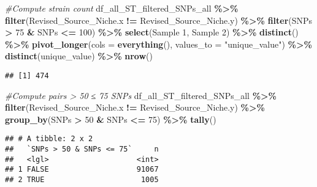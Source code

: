 \documentclass[
]{article}
\newenvironment{Shaded}{\begin{snugshade}}{\end{snugshade}}
\newcommand{\AttributeTok}[1]{\textcolor[rgb]{0.13,0.29,0.53}{#1}}
\newcommand{\CommentTok}[1]{\textcolor[rgb]{0.56,0.35,0.01}{\textit{#1}}}
\newcommand{\DecValTok}[1]{\textcolor[rgb]{0.00,0.00,0.81}{#1}}
\newcommand{\FunctionTok}[1]{\textcolor[rgb]{0.13,0.29,0.53}{\textbf{#1}}}
\newcommand{\NormalTok}[1]{#1}
\newcommand{\SpecialCharTok}[1]{\textcolor[rgb]{0.81,0.36,0.00}{\textbf{#1}}}
\newcommand{\StringTok}[1]{\textcolor[rgb]{0.31,0.60,0.02}{#1}}
\begin{document}
\begin{Shaded}
\begin{Highlighting}[]
\CommentTok{\#Compute strain count}
\NormalTok{df\_all\_ST\_filtered\_SNPs\_all }\SpecialCharTok{\%\textgreater{}\%} \FunctionTok{filter}\NormalTok{(Revised\_Source\_Niche.x }\SpecialCharTok{!=}\NormalTok{ Revised\_Source\_Niche.y) }\SpecialCharTok{\%\textgreater{}\%}
  \FunctionTok{filter}\NormalTok{(SNPs }\SpecialCharTok{\textgreater{}} \DecValTok{75} \SpecialCharTok{\&}\NormalTok{ SNPs }\SpecialCharTok{\textless{}=} \DecValTok{100}\NormalTok{) }\SpecialCharTok{\%\textgreater{}\%}
  \FunctionTok{select}\NormalTok{(}\StringTok{\textasciigrave{}}\AttributeTok{Sample 1}\StringTok{\textasciigrave{}}\NormalTok{, }\StringTok{\textasciigrave{}}\AttributeTok{Sample 2}\StringTok{\textasciigrave{}}\NormalTok{) }\SpecialCharTok{\%\textgreater{}\%}
  \FunctionTok{distinct}\NormalTok{() }\SpecialCharTok{\%\textgreater{}\%}
  \FunctionTok{pivot\_longer}\NormalTok{(}\AttributeTok{cols =} \FunctionTok{everything}\NormalTok{(), }\AttributeTok{values\_to =} \StringTok{"unique\_value"}\NormalTok{) }\SpecialCharTok{\%\textgreater{}\%}
  \FunctionTok{distinct}\NormalTok{(unique\_value) }\SpecialCharTok{\%\textgreater{}\%} \FunctionTok{nrow}\NormalTok{()}
\end{Highlighting}
\end{Shaded}

\begin{verbatim}
## [1] 474
\end{verbatim}

\begin{Shaded}
\begin{Highlighting}[]
\CommentTok{\#Compute pairs \textgreater{} 50 ≤ 75 SNPs}
\NormalTok{df\_all\_ST\_filtered\_SNPs\_all }\SpecialCharTok{\%\textgreater{}\%} \FunctionTok{filter}\NormalTok{(Revised\_Source\_Niche.x }\SpecialCharTok{!=}\NormalTok{ Revised\_Source\_Niche.y) }\SpecialCharTok{\%\textgreater{}\%} \FunctionTok{group\_by}\NormalTok{(SNPs }\SpecialCharTok{\textgreater{}} \DecValTok{50} \SpecialCharTok{\&}\NormalTok{ SNPs }\SpecialCharTok{\textless{}=} \DecValTok{75}\NormalTok{) }\SpecialCharTok{\%\textgreater{}\%} \FunctionTok{tally}\NormalTok{()}
\end{Highlighting}
\end{Shaded}

\begin{verbatim}
## # A tibble: 2 x 2
##   `SNPs > 50 & SNPs <= 75`     n
##   <lgl>                    <int>
## 1 FALSE                    91067
## 2 TRUE                      1005
\end{verbatim}
\end{document}
